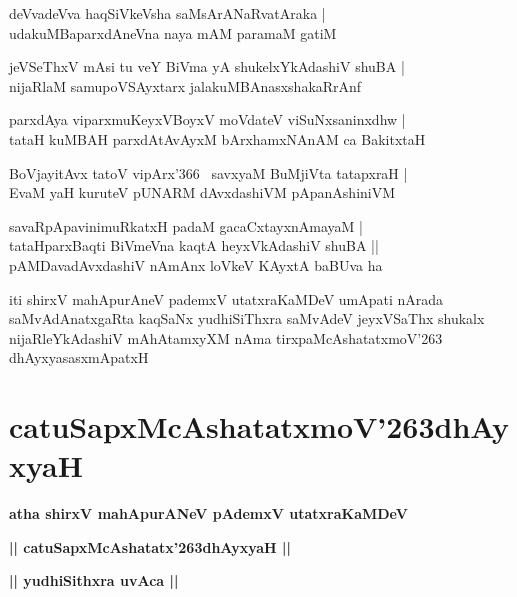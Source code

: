 \documentclass[twoside,12pt,openright]{book}
\def\S{\char'263}
\newcounter{shloka}[chapter]
\def\uvaca#1{\centerline{{\large\textbf{#1}}}}
\begin{document}
\begin{shloka}%
deVvadeVva haqSiVkeVsha saMsArANaRvatAraka |\\
udakuMBaparxdAneVna naya mAM paramaM gatiM 
\end{shloka}

\begin{shloka}%
jeVSeThxV mAsi tu veY BiVma yA shukelxYkAdashiV shuBA |\\
nijaRlaM samupoVSAyxtarx jalakuMBAnasxshakaRrAnf 
\end{shloka}

\begin{shloka}%
parxdAya viparxmuKeyxVBoyxV moVdateV viSuNxsaninxdhw |\\
tataH kuMBAH parxdAtAvAyxM bArxhamxNAnAM ca BakitxtaH 
\end{shloka}

\begin{shloka}%
BoVjayitAvx tatoV vipArx\char'366 ~savxyaM BuMjiVta tatapxraH |\\
EvaM yaH kuruteV pUNARM dAvxdashiVM pApanAshiniVM
\end{shloka}

\begin{shloka}%
savaRpApavinimuRkatxH padaM gacaCxtayxnAmayaM |\\
tataHparxBaqti BiVmeVna kaqtA heyxVkAdashiV shuBA  ||\\
pAMDavadAvxdashiV nAmAnx loVkeV KAyxtA baBUva ha
\end{shloka}

\begin{center}
iti shirxV mahApurAneV pademxV utatxraKaMDeV umApati nArada saMvAdAnatxgaRta kaqSaNx yudhiSiThxra 
saMvAdeV jeyxVSaThx shukalx nijaRleYkAdashiV mAhAtamxyXM nAma tirxpaMcAshatatxmoV\S 
dhAyxyasasxmApatxH
\end{center}

\chapter{catuSapxMcAshatatxmoV\S dhAyxyaH}

\begin{center}
{\LARGE\bfseries atha shirxV mahApurANeV pAdemxV utatxraKaMDeV}
\end{center}

\begin{center}
{\LARGE\bfseries || catuSapxMcAshatatx\S dhAyxyaH ||}
\end{center}

\uvaca{|| yudhiSithxra uvAca ||}
\end{document}
